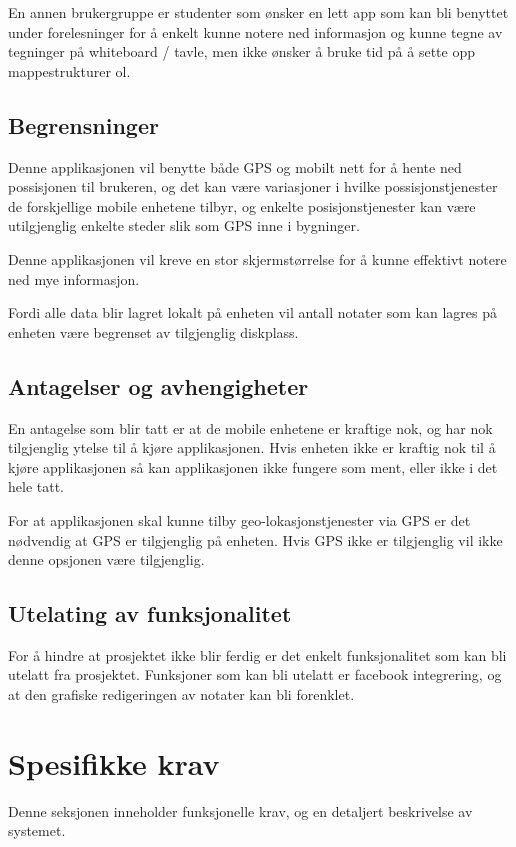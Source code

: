 \documentclass[a4paper, 12pt]{article}
\begin{document}
En annen brukergruppe er studenter som ønsker en lett app som kan bli benyttet under forelesninger for å enkelt kunne notere ned informasjon og kunne tegne av tegninger på whiteboard / tavle, men ikke ønsker å bruke tid på å sette opp mappestrukturer ol.

\subsection{Begrensninger}
Denne applikasjonen vil benytte både GPS og mobilt nett for å hente ned possisjonen til brukeren, og det kan være variasjoner i hvilke possisjonstjenester de forskjellige mobile enhetene tilbyr, og enkelte posisjonstjenester kan være utilgjenglig enkelte steder slik som GPS inne i bygninger.

Denne applikasjonen vil kreve en stor skjermstørrelse for å kunne effektivt notere ned mye informasjon.

Fordi alle data blir lagret lokalt på enheten vil antall notater som kan lagres på enheten være begrenset av tilgjenglig diskplass.

\subsection{Antagelser og avhengigheter}
En antagelse som blir tatt er at de mobile enhetene er kraftige nok, og har nok tilgjenglig ytelse til å kjøre applikasjonen. Hvis enheten ikke er kraftig nok til å kjøre applikasjonen så kan applikasjonen ikke fungere som ment, eller ikke i det hele tatt.

For at applikasjonen skal kunne tilby geo-lokasjonstjenester via GPS er det nødvendig at GPS er tilgjenglig på enheten. Hvis GPS ikke er tilgjenglig vil ikke denne opsjonen være tilgjenglig.

\subsection{Utelating av funksjonalitet}
For å hindre at prosjektet ikke blir ferdig er det enkelt funksjonalitet som kan bli utelatt fra prosjektet. Funksjoner som kan bli utelatt er facebook integrering, og at den grafiske redigeringen av notater kan bli forenklet.

\section{Spesifikke krav}
Denne seksjonen inneholder funksjonelle krav, og en detaljert beskrivelse av systemet.
\end{document}
